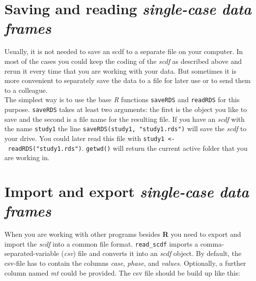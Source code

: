 \documentclass[
]{book}
\begin{document}
\hypertarget{saving-and-reading-single-case-data-frames}{%
\section{\texorpdfstring{Saving and reading \emph{single-case data frames}}{Saving and reading single-case data frames}}\label{saving-and-reading-single-case-data-frames}}

Usually, it is not needed to save an scdf to a separate file on your computer. In most of the cases you could keep the coding of the \emph{scdf} as described above and rerun it every time that you are working with your data. But sometimes it is more convenient to separately save the data to a file for later use or to send them to a colleague.\\
The simplest way is to use the base \emph{R} functions \texttt{saveRDS} and \texttt{readRDS} for this purpose. \texttt{saveRDS} takes at least two arguments: the first is the object you like to save and the second is a file name for the resulting file. If you have an \emph{scdf} with the name \texttt{study1} the line \texttt{saveRDS(study1,\ "study1.rds")} will save the \emph{scdf} to your drive. You could later read this file with \texttt{study1\ \textless{}-\ readRDS("study1.rds")}. \texttt{getwd()} will return the current active folder that you are working in.

\hypertarget{import-and-export-single-case-data-frames}{%
\section{\texorpdfstring{Import and export \emph{single-case data frames}}{Import and export single-case data frames}}\label{import-and-export-single-case-data-frames}}

When you are working with other programs besides \textbf{R} you need to export and import the \emph{scdf} into a common file format. \texttt{read\_scdf} imports a comma-separated-variable (\emph{csv}) file and converts it into an \emph{scdf} object. By default, the csv-file has to contain the columns \emph{case}, \emph{phase}, and \emph{values}. Optionally, a further column named \emph{mt} could be provided. The csv file should be build up like this:
\end{document}
